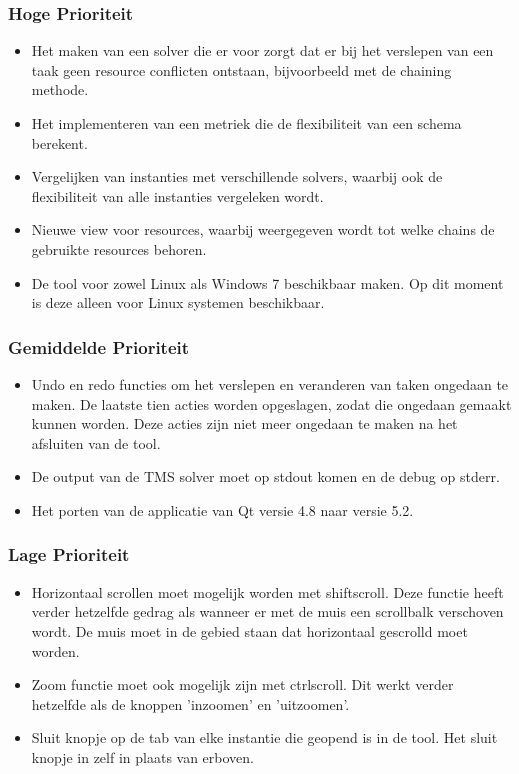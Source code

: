 \subsubsection*{Hoge Prioriteit}
\begin{itemize}
	\item Het maken van een solver die er voor zorgt dat er bij het verslepen van een taak geen resource conflicten ontstaan, bijvoorbeeld met de chaining methode.
	\item Het implementeren van een metriek die de flexibiliteit van een schema berekent.
	\item Vergelijken van instanties met verschillende solvers, waarbij ook de flexibiliteit van alle instanties vergeleken wordt.
	\item Nieuwe view voor resources, waarbij weergegeven wordt tot welke chains de gebruikte resources behoren.
	\item De tool voor zowel Linux als Windows 7 beschikbaar maken. Op dit moment is deze alleen voor Linux systemen beschikbaar.
\end{itemize}

\subsubsection*{Gemiddelde Prioriteit}
\begin{itemize}
	\item Undo en redo functies om het verslepen en veranderen van taken ongedaan te maken. De laatste tien acties worden opgeslagen, zodat die ongedaan gemaakt kunnen worden. Deze acties zijn niet meer ongedaan te maken na het afsluiten van de tool.
	\item De output van de TMS solver moet op stdout komen en de debug op stderr.
	\item Het porten van de applicatie van Qt versie 4.8 naar versie 5.2.
\end{itemize}

\subsubsection*{Lage Prioriteit}
\begin{itemize}
	\item Horizontaal scrollen moet mogelijk worden met shift\plus scroll. Deze functie heeft verder hetzelfde gedrag als wanneer er met de muis een scrollbalk verschoven wordt. De muis moet in de gebied staan dat horizontaal gescrolld moet worden. 
	\item Zoom functie moet ook mogelijk zijn met ctrl\plus scroll. Dit werkt verder hetzelfde als de knoppen 'inzoomen' en 'uitzoomen'.
	\item Sluit knopje op de tab van elke instantie die geopend is in de tool. Het sluit knopje in  zelf in plaats van erboven.
\end{itemize}

